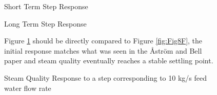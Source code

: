         \begin{figure}[ht]
            \begin{center}
                
                Short Term Step Response
                
                
                Long Term Step Response
                
                \caption{Steam Quality Response to a step corresponding to 10 kg/s feed water flow rate}
                \label{fig:Valve_Open2D}
            \end{center}
            Figure \ref{fig:Valve_Open2D} should be directly compared to Figure \ref{fig:Fig8F}, the initial response matches what was seen in the \r{A}str\"{o}m and Bell paper and steam quality eventually reaches a stable settling point.
        \end{figure}  %
        

